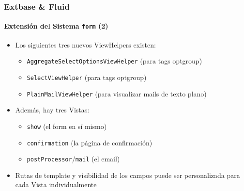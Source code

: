 \begin{frame}[fragile]
	\frametitle{Extbase \& Fluid}
	\framesubtitle{Extensión del Sistema \texttt{form} (2)}

	\begin{itemize}

		\item Los siguientes tres nuevos ViewHelpers existen:

			\begin{itemize}
				\item \texttt{AggregateSelectOptionsViewHelper} (para tags optgroup)
				\item \texttt{SelectViewHelper} (para tags optgroup)
				\item \texttt{PlainMailViewHelper} (para visualizar mails de texto plano)
			\end{itemize}

		\item Además, hay tres Vistas:

			\begin{itemize}
				\item \texttt{show} (el form en sí mismo)
				\item \texttt{confirmation} (la página de confirmación)
				\item \texttt{postProcessor}/\texttt{mail} (el email)
			\end{itemize}

		\item Rutas de template y visibilidad de los campos puede ser personalizada
			para cada Vista individualmente

	\end{itemize}

\end{frame}


